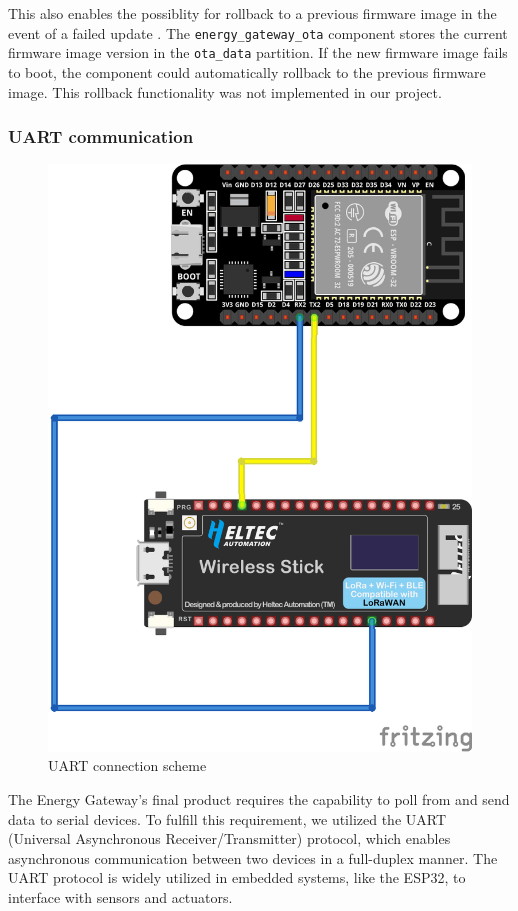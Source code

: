 This also enables the possiblity for rollback to a previous firmware image in the event of a failed update \cite{espressif:esp-idf-programming-guide}. The \texttt{energy\_gateway\_ota} component stores the current firmware image version in the \texttt{ota\_data} partition. If the new firmware image fails to boot, the component could automatically rollback to the previous firmware image. This rollback functionality was not implemented in our project.

\subsubsection{UART communication}

\begin{figure}[ht]
  \centering
  \includegraphics[width=0.8\linewidth]{figures/uart_connection.png}
  \caption{UART connection scheme}
  \label{fig:uart_connection}
\end{figure}

The Energy Gateway's final product requires the capability to poll from and send data to serial devices. To fulfill this requirement, we utilized the UART (Universal Asynchronous Receiver/Transmitter) protocol, which enables asynchronous communication between two devices in a full-duplex manner. The UART protocol is widely utilized in embedded systems, like the ESP32, to interface with sensors and actuators.


